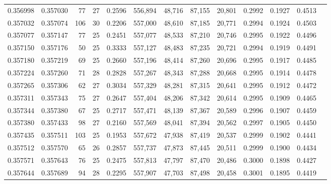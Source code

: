 \begin{tabular}{rrrrrrrrrrrrr}
0.356998 & 0.357030 &    77 &  27 &                                     0.2596 & 556,894 &  48,716 &  87,155 &  20,801 & 0.2992 & 0.1927 & 0.4513 \\
0.357032 & 0.357074 &   106 &  30 &                                     0.2206 & 557,000 &  48,610 &  87,185 &  20,771 & 0.2994 & 0.1924 & 0.4503 \\
0.357077 & 0.357147 &    77 &  25 &                                     0.2451 & 557,077 &  48,533 &  87,210 &  20,746 & 0.2995 & 0.1922 & 0.4496 \\
0.357150 & 0.357176 &    50 &  25 &                                     0.3333 & 557,127 &  48,483 &  87,235 &  20,721 & 0.2994 & 0.1919 & 0.4491 \\
0.357180 & 0.357219 &    69 &  25 &                                     0.2660 & 557,196 &  48,414 &  87,260 &  20,696 & 0.2995 & 0.1917 & 0.4485 \\
0.357224 & 0.357260 &    71 &  28 &                                     0.2828 & 557,267 &  48,343 &  87,288 &  20,668 & 0.2995 & 0.1914 & 0.4478 \\
0.357265 & 0.357306 &    62 &  27 &                                     0.3034 & 557,329 &  48,281 &  87,315 &  20,641 & 0.2995 & 0.1912 & 0.4472 \\
0.357311 & 0.357343 &    75 &  27 &                                     0.2647 & 557,404 &  48,206 &  87,342 &  20,614 & 0.2995 & 0.1909 & 0.4465 \\
0.357344 & 0.357380 &    67 &  25 &                                     0.2717 & 557,471 &  48,139 &  87,367 &  20,589 & 0.2996 & 0.1907 & 0.4459 \\
0.357380 & 0.357433 &    98 &  27 &                                     0.2160 & 557,569 &  48,041 &  87,394 &  20,562 & 0.2997 & 0.1905 & 0.4450 \\
0.357435 & 0.357511 &   103 &  25 &                                     0.1953 & 557,672 &  47,938 &  87,419 &  20,537 & 0.2999 & 0.1902 & 0.4441 \\
0.357512 & 0.357570 &    65 &  26 &                                     0.2857 & 557,737 &  47,873 &  87,445 &  20,511 & 0.2999 & 0.1900 & 0.4434 \\
0.357571 & 0.357643 &    76 &  25 &                                     0.2475 & 557,813 &  47,797 &  87,470 &  20,486 & 0.3000 & 0.1898 & 0.4427 \\
0.357644 & 0.357689 &    94 &  28 &                                     0.2295 & 557,907 &  47,703 &  87,498 &  20,458 & 0.3001 & 0.1895 & 0.4419 \\

\end{tabular}
